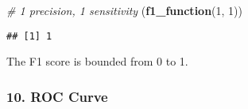 \documentclass[
]{article}
\newenvironment{Shaded}{\begin{snugshade}}{\end{snugshade}}
\newcommand{\CommentTok}[1]{\textcolor[rgb]{0.56,0.35,0.01}{\textit{#1}}}
\newcommand{\DecValTok}[1]{\textcolor[rgb]{0.00,0.00,0.81}{#1}}
\newcommand{\KeywordTok}[1]{\textcolor[rgb]{0.13,0.29,0.53}{\textbf{#1}}}
\newcommand{\NormalTok}[1]{#1}
\begin{document}
\begin{Shaded}
\begin{Highlighting}[]
\CommentTok{# 1 precision, 1 sensitivity}
\NormalTok{(}\KeywordTok{f1_function}\NormalTok{(}\DecValTok{1}\NormalTok{, }\DecValTok{1}\NormalTok{))}
\end{Highlighting}
\end{Shaded}

\begin{verbatim}
## [1] 1
\end{verbatim}

The F1 score is bounded from 0 to 1.

\hypertarget{roc-curve}{%
\subsubsection{10. ROC Curve}\label{roc-curve}}
\end{document}

